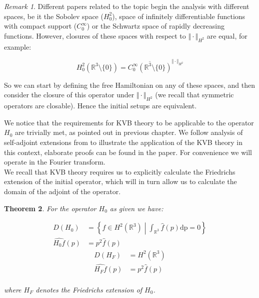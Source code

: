 \documentclass[11pt, a4paper, german]{article}
\theoremstyle{plain}
\newtheorem{theorem}{Theorem}
\theoremstyle{definition}
\theoremstyle{remark}
\newtheorem{remark}[theorem]{Remark}
\numberwithin{equation}{section}
\numberwithin{theorem}{section}
\begin{document}
\begin{remark}
Different papers related to the topic begin the analysis with different spaces, be it the Sobolev space ($H^2_0$), space of infinitely differentiable functions with compact support ($C^\infty_0$) or the Schwartz space of rapidly decreasing functions. However, closures of these spaces with respect to $\Vert \cdot \Vert _{H^2}$ are equal, for example:

\begin{equation}
H^2_0(\mathbb R ^3 \setminus \{0\}) = \overline{C_0^\infty(\mathbb R ^3 \setminus \{0\})} ^ {\Vert \cdot \Vert _{H^2}}
\end{equation}

So we can start by defining the free Hamiltonian on any of these spaces, and then consider the closure of this operator under $\Vert \cdot \Vert _{H^2}$ (we recall that symmetric operators are closable). Hence the initial setups are equivalent.
\end{remark}

We notice that the requirements for KVB theory to be applicable to the operator $H_0$ are trivially met, as pointed out in previous chapter. We follow analysis of self-adjoint extensions from \cite{A2} to illustrate the application of the KVB theory in this context, elaborate proofs can be found in the paper. For convenience we will operate in the Fourier transform.\\

We recall that KVB theory requires us to explicitly calculate the Friedrichs extension of the initial operator, which will in turn allow us to calculate the domain of the adjoint of the operator.

\begin{theorem}
For the operator $H_0$ as given we have:

\begin{align}
D(H_0) &=\left\{f\in H^2(\mathbb R ^3) \middle| \int_{\mathbb R ^3} \widehat{f} (p) \text{dp} = 0 \right\}\\
\widehat{H_0 f}(p) &= p^2\widehat{f}(p)
\end{align}
\begin{align}
D(H_F) &=H^2(\mathbb R^3)\\
\widehat{H_F f}(p) &= p^2\widehat{f}(p)
\end{align}\\

where $H_F$ denotes the Friedrichs extension of $H_0$.

\end{theorem}
\end{document}
